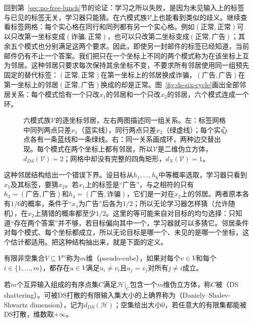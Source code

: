 回到第~\ref{sec:no-free-lunch}节的论证：学习之所以失败，是因为未见输入上的标签与已见的标签无关，学习器只能猜。在六模式族$\mathcal V$上也能看到类似的歧义。继续查看标签网格：每个实心格在同行和同列都有另一个实心格。例如$(\text{正常},\text{正常})$可以只改第一坐标变成$(\text{诈骗},\text{正常})$，也可以只改第二坐标变成$(\text{正常},\text{广告})$；其余五个模式也分别满足这两个要求。因此，即使另一封邮件的标签已经知道，当前邮件仍有不止一个答案。我们把只在一个坐标上不同的两个模式称为在该坐标上互为邻居。这种邻居只要求每次保持其余坐标不变，不要求所有邻居使用同一组预先固定的替代标签：$(\text{正常},\text{正常})$在第一坐标上的邻居换成诈骗，$(\text{广告},\text{广告})$在第一坐标上的邻居$(\text{正常},\text{广告})$换成的却是正常。图~\ref{fig:ds-six-cycle}画出全部邻居关系：每个模式恰有一个只改$x_1$的邻居和一个只改$x_2$的邻居，六个模式连成一个环。

\begin{figure}[htbp]
  \centering
  
  \caption{六模式族$\mathcal V$的逐坐标邻居，左右两图描述同一组关系。左：标签网格中同列两点只差$x_1$（蓝实线），同行两点只差$x_2$（绿虚线）；每个实心点各有一条蓝线和一条绿线。右：同一关系画成环，两种边交替出现。每个模式在两个坐标上都有邻居，所以$\mathcal V$是二维伪立方体，$d_{DS}(\mathcal V)=2$；网格中却没有完整的四角矩形，$d_N(\mathcal V)=1$。}
  \label{fig:ds-six-cycle}
  \label{fig:learning-theory-ds-neighbors}
  \label{fig:lt6-pseudocube-neighbors}
\end{figure}

这种邻居结构给出一个错误下界。设目标从$h_1,\ldots,h_6$中等概率选取，学习器只看到$x_1$及其标签，要猜$x_2$。若$x_1$上的标签是“广告”，与之相符的只有$h_3=(\text{广告},\text{广告})$和$h_4=(\text{广告},\text{诈骗})$，它们是一对在$x_2$上的邻居。两者原本各有$1/6$的概率，条件于“$x_1$为广告”后各为$1/2$；所以无论学习器怎样猜（允许随机），在$x_2$上猜错的概率都至少$1/2$。这里的等可能来自对目标的均匀选择：只知道“存在两个答案”并不够，若目标偏向其中一个，学习器就可以多猜它。邻居条件对每个模式、每个坐标都成立，所以无论目标是哪一个、未见的是哪一个坐标，这个估计都适用。把这种结构抽出来，就是下面的定义。

\begin{definition}[伪立方体]
\label{def:pseudocube}
有限非空集合$V\subseteq Y^m$称为$m$维（pseudo-cube），如果对每个$v\in V$和每个$i\in\{1,\ldots,m\}$，都存在$u\in V$满足$u_i\neq v_i$且$u_j=v_j$对所有$j\neq i$成立。
\end{definition}

\begin{definition}[DS维]
\label{def:ds-dimension}
若$m$个互异输入组成的有序点集$C$满足$\mathcal H|_C$包含一个$m$维伪立方体，称$C$被（DS shattering）。可被DS打散的有限输入集大小的上确界称为（Daniely--Shalev-Shwartz dimension），记为$d_{DS}(\mathcal H)$；空集给出大小$0$，若任意大的有限集都能被DS打散，维数取$+\infty$。
\end{definition}

